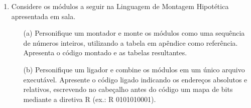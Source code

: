 \begin{enumerate}[resume]
    \item
    Considere os módulos a seguir na Linguagem de Montagem Hipotética apresentada em sala.
    
    \begin{multicols}{2}
    \end{multicols}

    \begin{itemize}
        \item [(a)]
        Personifique um montador e monte os módulos como uma sequência de números inteiros,
        utilizando a tabela em apêndice como referência. 
        Apresenta o código montado e as tabelas resultantes.

        \item [(b)]
        Personifique um ligador e combine os módulos em um único arquivo executável.
        Apresente o código ligado indicando os endereços absolutos e relativos,
        escrevendo no cabeçalho antes do código um mapa de bits mediante a diretiva R
        (ex.: R 0101010001). 
    \end{itemize}
\end{enumerate}
